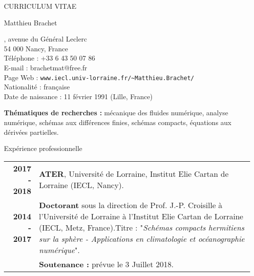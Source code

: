 \documentclass[10pt,a4paper]{report}
\def\cvpart{\noindent \hrulefill}
\def\sp{\vspace{6mm}}
\begin{document}
\begin{center}
{\selectfont
\begin{LARGE}
CURRICULUM VITAE
\end{LARGE}

\begin{large}
Matthieu Brachet
\end{large}

\hrulefill
}
\end{center}

, avenue du Général Leclerc\\
54 000 Nancy, France
\vspace{0.2cm}\\
Téléphone : +33 6 43 50 07 86\\
E-mail : brachetmat@free.fr\\
Page Web : \verb?www.iecl.univ-lorraine.fr/~Matthieu.Brachet/?
\vspace{0.2cm}\\
Nationalité : française\\
Date de naissance : 11 février 1991 (Lille, France)

\cvpart

\noindent
\textbf{Thématiques de recherches : } mécanique des fluides numérique, analyse numérique, schémas aux différences finies, schémas compacts, équations aux dérivées partielles.







\sp
{\selectfont
\begin{Large}
Expérience professionnelle
\end{Large}
\cvpart
}
\sp

\begin{center}
\begin{tabular}{r p{12cm}}
\textbf{2017 - 2018} & \textbf{ATER}, Université de Lorraine, Institut Elie Cartan de Lorraine (IECL, Nancy). \vspace{2mm}\\

\textbf{2014 - 2017} & \textbf{Doctorant} sous la direction de Prof. J.-P. Croisille à l'Université de Lorraine à l'Institut Elie Cartan de Lorraine (IECL, Metz, France).\newline Titre : "\textit{Schémas compacts hermitiens sur la sphère - Applications en climatologie et océanographie numérique}".\vspace{2mm}\\
	
	& \textbf{Soutenance :} prévue le 3 Juillet 2018.\\
\end{tabular}
\end{center}
\end{document}
